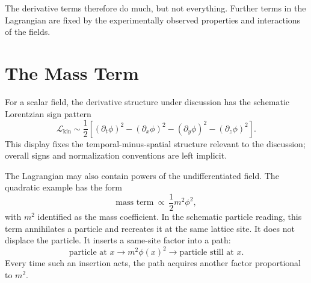 \begin{classroomqa}
\end{classroomqa}


The derivative terms therefore do much, but not everything. Further terms in the Lagrangian are fixed by the experimentally observed properties and interactions of the fields.

\section{The Mass Term}

For a scalar field, the derivative structure under discussion has the schematic Lorentzian sign pattern
\begin{equation}
\mathcal{L}_{\mathrm{kin}}
\sim
\frac{1}{2}\left[
(\partial_t\phi)^2
-(\partial_x\phi)^2
-(\partial_y\phi)^2
-(\partial_z\phi)^2
\right].
\end{equation}
This display fixes the temporal-minus-spatial structure relevant to the discussion; overall signs and normalization conventions are left implicit.

The Lagrangian may also contain powers of the undifferentiated field. The quadratic example has the form
\begin{equation}
\text{mass term}\ \propto\ \frac{1}{2}m^2\phi^2,
\end{equation}
with \(m^2\) identified as the mass coefficient. In the schematic particle reading, this term annihilates a particle and recreates it at the same lattice site. It does not displace the particle. It inserts a same-site factor into a path:
\begin{equation}
\text{particle at }x
\longrightarrow
\boxed{m^2\phi(x)^2}
\longrightarrow
\text{particle still at }x.
\end{equation}
Every time such an insertion acts, the path acquires another factor proportional to \(m^2\).

